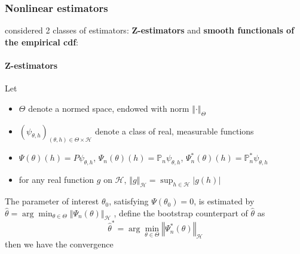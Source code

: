\documentclass[twoside]{article}
\begin{document}
\subsubsection{Nonlinear estimators}
\citet{davezies2021empirical} considered 2 classes of estimators: \textbf{Z-estimators} and \textbf{smooth functionals of the empirical cdf}:
\paragraph*{Z-estimators} 
Let 
\begin{itemize}
    \item $\Theta$ denote a normed space, endowed with norm $\left\Vert \cdot \right\Vert _{\Theta}$
    \item $\left(\psi_{\theta,h}\right)_{(\theta,h)\in\Theta\times \mathcal{H}}$ denote a class of real, measurable functions
    \item $\Psi(\theta)(h)=P\psi_{\theta,h}$, $\Psi_n(\theta)(h) = \mathbb{P}_n \psi_{\theta,h}$, $\Psi^*_n(\theta)(h)=\mathbb{P}^*_n\psi_{\theta,h}$
    \item for any real function $g$ on $\mathcal{H}$, $\left\Vert g \right\Vert _{\mathcal{H}} = \sup_{h\in\mathcal{H}}\left\vert g(h) \right\vert$
\end{itemize}
The parameter of interest $\theta_0$, satisfying $\Psi(\theta_0) = 0$, is estimated by $\hat{\theta} = \arg\min_{\theta\in\Theta} \left\Vert \Psi_n(\theta) \right\Vert _{\mathcal{H}}$ , define the bootstrap counterpart of $\hat{\theta}$ as $$ \hat{\theta}^* = \arg\min_{\theta\in\Theta} \left\Vert \Psi^*_n\left(\theta\right) \right\Vert _{\mathcal{H}} $$
then we have the convergence 
\end{document}
